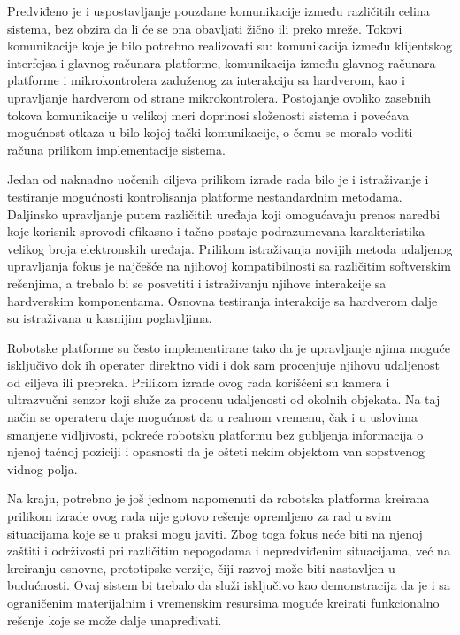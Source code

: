 \documentclass[12pt,a4paper]{report}
\begin{document}
Predviđeno je i uspostavljanje pouzdane komunikacije između različitih celina sistema, bez obzira da li će se ona obavljati žično ili preko mreže. Tokovi komunikacije koje je bilo potrebno realizovati su: komunikacija između klijentskog interfejsa i glavnog računara platforme, komunikacija između glavnog računara platforme i mikrokontrolera zaduženog za interakciju sa hardverom, kao i upravljanje hardverom od strane mikrokontrolera. Postojanje ovoliko zasebnih tokova komunikacije u velikoj meri doprinosi složenosti sistema i povećava mogućnost otkaza u bilo kojoj tački komunikacije, o čemu se moralo voditi računa prilikom implementacije sistema.

Jedan od naknadno uočenih ciljeva prilikom izrade rada bilo je i istraživanje i testiranje mogućnosti kontrolisanja platforme nestandardnim metodama. Daljinsko upravljanje putem različitih uređaja koji omogućavaju prenos naredbi koje korisnik sprovodi efikasno i tačno postaje podrazumevana karakteristika velikog broja elektronskih uređaja. Prilikom istraživanja novijih metoda udaljenog upravljanja fokus je najčešće na njihovoj kompatibilnosti sa različitim softverskim rešenjima, a trebalo bi se posvetiti i istraživanju njihove interakcije sa hardverskim komponentama. Osnovna testiranja interakcije sa hardverom dalje su istraživana u kasnijim poglavljima.

Robotske platforme su često implementirane tako da je upravljanje njima moguće isključivo dok ih operater direktno vidi i dok sam procenjuje njihovu udaljenost od ciljeva ili prepreka. Prilikom izrade ovog rada korišćeni su kamera i ultrazvučni senzor koji služe za procenu udaljenosti od okolnih objekata. Na taj način se operateru daje mogućnost da u realnom vremenu, čak i u uslovima smanjene vidljivosti, pokreće robotsku platformu bez gubljenja informacija o njenoj tačnoj poziciji i opasnosti da je ošteti nekim objektom van sopstvenog vidnog polja.

Na kraju, potrebno je još jednom napomenuti da robotska platforma kreirana prilikom izrade ovog rada nije gotovo rešenje opremljeno za rad u svim situacijama koje se u praksi mogu javiti. Zbog toga fokus neće biti na njenoj zaštiti i održivosti pri različitim nepogodama i nepredviđenim situacijama, već na kreiranju osnovne, prototipske verzije, čiji razvoj može biti nastavljen u budućnosti. Ovaj sistem bi trebalo da služi isključivo kao demonstracija da je i sa ograničenim materijalnim i vremenskim resursima moguće kreirati funkcionalno rešenje koje se može dalje unapređivati.
\end{document}
